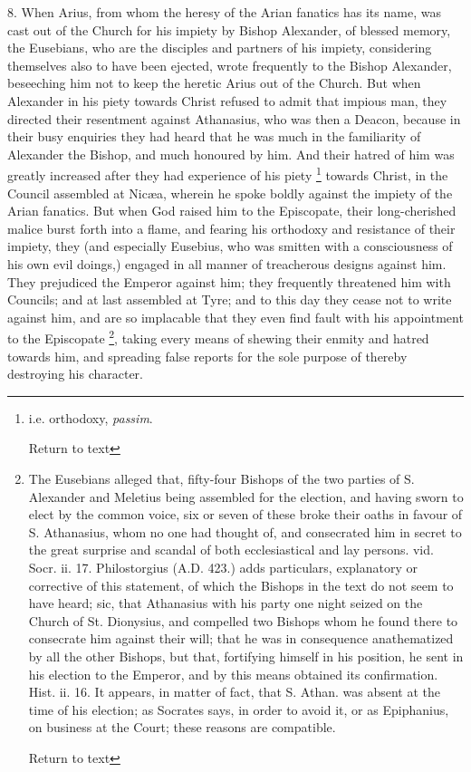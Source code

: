 8. When Arius, from whom the heresy of the Arian
fanatics has its name, was cast out of the Church for his impiety by
Bishop Alexander, of blessed memory, the Eusebians, who are the
disciples and partners of his impiety, considering themselves also to
have been ejected, wrote frequently to the Bishop Alexander,
beseeching him not to keep the heretic Arius out of the Church. But
when Alexander in his piety towards Christ refused to admit that
impious man, they directed their resentment against Athanasius, who
was then a Deacon, because in their busy enquiries they had heard that
he was much in the familiarity of Alexander the Bishop, and much
honoured by him. And their hatred of him was greatly increased after
they had experience of his piety \footnote{i.e. orthodoxy, \emph{passim}.

Return to text} towards Christ, in the Council assembled at Nicæa, wherein he
spoke boldly against the impiety of the Arian fanatics. But when God
raised him to the Episcopate, their long-cherished malice burst forth
into a flame, and fearing his orthodoxy and resistance of their
impiety, they (and especially Eusebius, who was smitten with a
consciousness of his own evil doings,) engaged in all manner of
treacherous designs against him. They prejudiced the Emperor against
him; they frequently threatened him with Councils; and at last
assembled at Tyre; and to this day they cease not to write against
him, and are so implacable that they even find fault with his
appointment to the Episcopate \footnote{The Eusebians alleged that, fifty-four Bishops
of the two parties of S. Alexander and Meletius being assembled for
the election, and having sworn to elect by the common voice, six or
seven of these broke their oaths in favour of S. Athanasius, whom no
one had thought of, and consecrated him in secret to the great
surprise and scandal of both ecclesiastical and lay persons. vid. Socr.
ii. 17. Philostorgius (A.D. 423.) adds particulars, explanatory or
corrective of this statement, of which the Bishops in the text do not
seem to have heard; sic, that Athanasius with his party one night
seized on the Church of St. Dionysius, and compelled two Bishops whom
he found there to consecrate him against their will; that he was in
consequence anathematized by all the other Bishops, but that,
fortifying himself in his position, he sent in his election to the
Emperor, and by this means obtained its confirmation. Hist. ii. 16. It
appears, in matter of fact, that S. Athan. was absent at the time of
his election; as Socrates says, in order to avoid it, or as Epiphanius,
on business at the Court; these reasons are compatible.

Return to text},
taking every means of shewing their enmity and hatred towards
him, and spreading false reports for the sole purpose of thereby
destroying his character.

